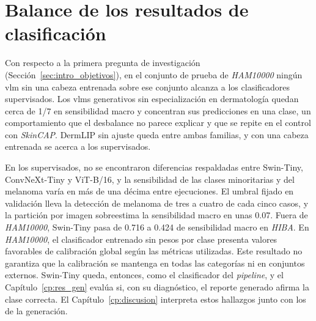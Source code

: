 \section{Balance de los resultados de clasificación}
\label{sec:res_clasif_discusion}

Con respecto a la primera pregunta de investigación (Sección~\ref{sec:intro_objetivos}), en el conjunto de prueba de
\emph{HAM10000} ningún \gls{vlm} sin una cabeza entrenada sobre ese conjunto alcanza a los clasificadores supervisados.
Los \glspl{vlm} generativos sin especialización en dermatología quedan cerca de 1/7 en sensibilidad macro y concentran sus predicciones en una clase, un comportamiento que el desbalance no parece explicar y que se repite en el control con \emph{SkinCAP}. DermLIP sin ajuste queda entre ambas familias, y con
una cabeza entrenada se acerca a los supervisados. 

En los supervisados, no se encontraron diferencias respaldadas entre Swin-Tiny, ConvNeXt-Tiny y ViT-B/16, y la sensibilidad de las clases
minoritarias y del melanoma varía en más de una décima entre ejecuciones. El umbral fijado en validación lleva la
detección de melanoma de tres a cuatro de cada cinco casos, y la partición por imagen sobreestima la sensibilidad
macro en unas 0.07. Fuera de \emph{HAM10000}, Swin-Tiny pasa de 0.716 a 0.424 de sensibilidad macro en \emph{HIBA}. En \emph{HAM10000}, el clasificador entrenado sin pesos por clase presenta valores favorables de calibración global según las métricas utilizadas. Este resultado no garantiza que la calibración se mantenga en todas las categorías ni en conjuntos externos. Swin-Tiny queda,
entonces, como el clasificador del \emph{pipeline}, y el Capítulo~\ref{cp:res_gen} evalúa si, con su diagnóstico, el
reporte generado afirma la clase correcta. El Capítulo~\ref{cp:discusion} interpreta estos hallazgos junto con los de
la generación.
